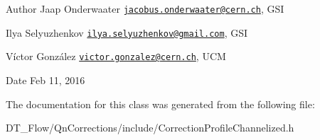\begin{DoxyAuthor}{Author}
Jaap Onderwaater \href{mailto:jacobus.onderwaater@cern.ch}{\tt jacobus.\+onderwaater@cern.\+ch}, G\+SI 

Ilya Selyuzhenkov \href{mailto:ilya.selyuzhenkov@gmail.com}{\tt ilya.\+selyuzhenkov@gmail.\+com}, G\+SI 

Víctor González \href{mailto:victor.gonzalez@cern.ch}{\tt victor.\+gonzalez@cern.\+ch}, U\+CM 
\end{DoxyAuthor}
\begin{DoxyDate}{Date}
Feb 11, 2016 
\end{DoxyDate}


The documentation for this class was generated from the following file\+:\begin{DoxyCompactItemize}
\item 
D\+T\+\_\+\+Flow/\+Qn\+Corrections/include/Correction\+Profile\+Channelized.\+h\end{DoxyCompactItemize}
